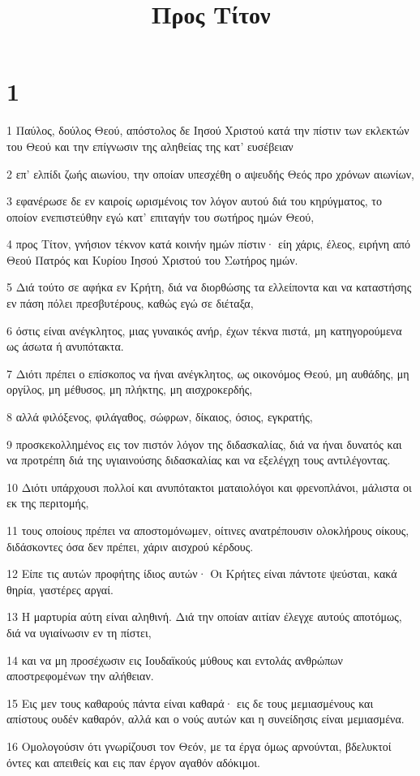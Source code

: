 

\title{Προς Τίτον}


\chapter{1}

\par 1 Παύλος, δούλος Θεού, απόστολος δε Ιησού Χριστού κατά την πίστιν των εκλεκτών του Θεού και την επίγνωσιν της αληθείας της κατ' ευσέβειαν
\par 2 επ' ελπίδι ζωής αιωνίου, την οποίαν υπεσχέθη ο αψευδής Θεός προ χρόνων αιωνίων,
\par 3 εφανέρωσε δε εν καιροίς ωρισμένοις τον λόγον αυτού διά του κηρύγματος, το οποίον ενεπιστεύθην εγώ κατ' επιταγήν του σωτήρος ημών Θεού,
\par 4 προς Τίτον, γνήσιον τέκνον κατά κοινήν ημών πίστιν· είη χάρις, έλεος, ειρήνη από Θεού Πατρός και Κυρίου Ιησού Χριστού του Σωτήρος ημών.
\par 5 Διά τούτο σε αφήκα εν Κρήτη, διά να διορθώσης τα ελλείποντα και να καταστήσης εν πάση πόλει πρεσβυτέρους, καθώς εγώ σε διέταξα,
\par 6 όστις είναι ανέγκλητος, μιας γυναικός ανήρ, έχων τέκνα πιστά, μη κατηγορούμενα ως άσωτα ή ανυπότακτα.
\par 7 Διότι πρέπει ο επίσκοπος να ήναι ανέγκλητος, ως οικονόμος Θεού, μη αυθάδης, μη οργίλος, μη μέθυσος, μη πλήκτης, μη αισχροκερδής,
\par 8 αλλά φιλόξενος, φιλάγαθος, σώφρων, δίκαιος, όσιος, εγκρατής,
\par 9 προσκεκολλημένος εις τον πιστόν λόγον της διδασκαλίας, διά να ήναι δυνατός και να προτρέπη διά της υγιαινούσης διδασκαλίας και να εξελέγχη τους αντιλέγοντας.
\par 10 Διότι υπάρχουσι πολλοί και ανυπότακτοι ματαιολόγοι και φρενοπλάνοι, μάλιστα οι εκ της περιτομής,
\par 11 τους οποίους πρέπει να αποστομόνωμεν, οίτινες ανατρέπουσιν ολοκλήρους οίκους, διδάσκοντες όσα δεν πρέπει, χάριν αισχρού κέρδους.
\par 12 Είπε τις αυτών προφήτης ίδιος αυτών· Οι Κρήτες είναι πάντοτε ψεύσται, κακά θηρία, γαστέρες αργαί.
\par 13 Η μαρτυρία αύτη είναι αληθινή. Διά την οποίαν αιτίαν έλεγχε αυτούς αποτόμως, διά να υγιαίνωσιν εν τη πίστει,
\par 14 και να μη προσέχωσιν εις Ιουδαϊκούς μύθους και εντολάς ανθρώπων αποστρεφομένων την αλήθειαν.
\par 15 Εις μεν τους καθαρούς πάντα είναι καθαρά· εις δε τους μεμιασμένους και απίστους ουδέν καθαρόν, αλλά και ο νούς αυτών και η συνείδησις είναι μεμιασμένα.
\par 16 Ομολογούσιν ότι γνωρίζουσι τον Θεόν, με τα έργα όμως αρνούνται, βδελυκτοί όντες και απειθείς και εις παν έργον αγαθόν αδόκιμοι.

